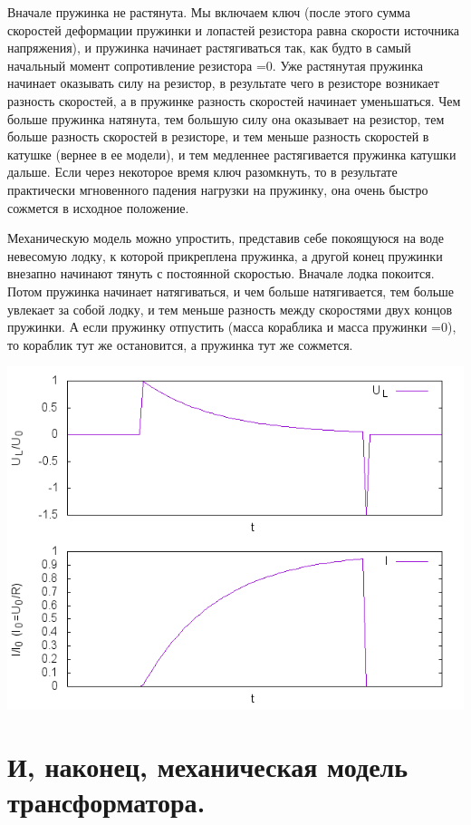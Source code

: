 \documentclass[11pt]{article} %
\begin{document}
Вначале пружинка не растянута. Мы включаем ключ (после этого сумма скоростей деформации пружинки и лопастей резистора равна скорости источника напряжения), и пружинка начинает растягиваться так, как будто в самый начальный момент сопротивление резистора =0. Уже растянутая пружинка начинает оказывать силу на резистор, в результате чего в резисторе возникает разность скоростей, а в пружинке разность скоростей начинает уменьшаться. Чем больше пружинка натянута, тем большую силу она оказывает на резистор, тем больше разность скоростей в резисторе, и тем меньше разность скоростей в катушке (вернее в ее модели), и тем медленнее растягивается пружинка катушки дальше. Если через некоторое время ключ разомкнуть, то в результате практически мгновенного падения нагрузки на пружинку, она очень быстро сожмется в исходное положение.

Механическую модель можно упростить, представив себе покоящуюся на воде невесомую лодку, к которой прикреплена пружинка, а другой конец пружинки внезапно начинают тянуть с постоянной скоростью. Вначале лодка покоится. Потом пружинка начинает натягиваться, и чем больше натягивается, тем больше увлекает за собой лодку, и тем меньше разность между скоростями двух концов пружинки. А если пружинку отпустить (масса кораблика и масса пружинки =0), то кораблик тут же остановится, а пружинка тут же сожмется.

\includegraphics{../plots/RL.png}

\section{И, наконец, механическая модель трансформатора.}
\end{document}
